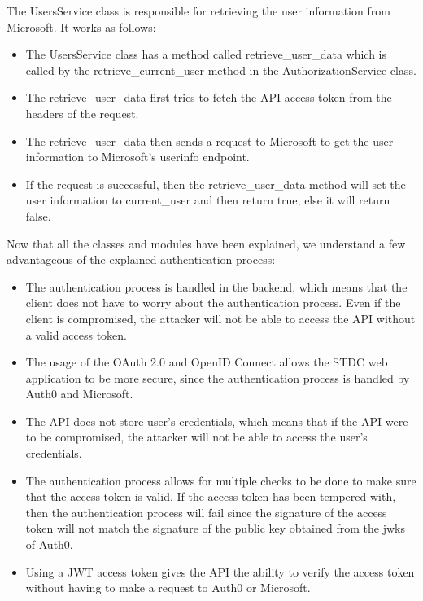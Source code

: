 \begin{justify}
        \newendline The UsersService class is responsible for retrieving the user information from Microsoft. It works as follows:

            \begin{itemize}
                \item The UsersService class has a method called retrieve\_user\_data which is called by the retrieve\_current\_user method in the AuthorizationService class.
                \item The retrieve\_user\_data first tries to fetch the API access token from the headers of the request.
                \item The retrieve\_user\_data then sends a request to Microsoft to get the user information to Microsoft's userinfo endpoint.
                \item If the request is successful, then the retrieve\_user\_data method will set the user information to current\_user and then return true, else it will return false.
            \end{itemize}

        \vspace{0.25cm}
        \newendline Now that all the classes and modules have been explained, we understand a few advantageous of the explained authentication process:

            \begin{itemize}
                \item The authentication process is handled in the backend, which means that the client does not have to worry about the authentication process. Even if the client is compromised, the attacker will not be able to access the API without a valid access token.
                \item The usage of the OAuth 2.0 and OpenID Connect allows the STDC web application to be more secure, since the authentication process is handled by Auth0 and Microsoft.
                \item The API does not store user's credentials, which means that if the API were to be compromised, the attacker will not be able to access the user's credentials.
                \item The authentication process allows for multiple checks to be done to make sure that the access token is valid. If the access token has been tempered with, then the authentication process will fail since the signature of the access token will not match the signature of the public key obtained from the jwks of Auth0.
                \item Using a JWT access token gives the API the ability to verify the access token without having to make a request to Auth0 or Microsoft.
            \end{itemize}
    

\end{justify}
